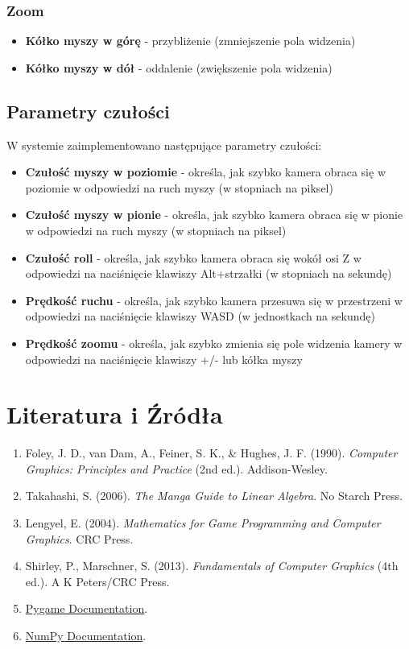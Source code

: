 \documentclass[a4paper,12pt]{article}
\begin{document}
\subsubsection{Zoom}
\begin{itemize}
    \item \textbf{Kółko myszy w górę} - przybliżenie (zmniejszenie pola widzenia)
    \item \textbf{Kółko myszy w dół} - oddalenie (zwiększenie pola widzenia)
\end{itemize}

\subsection{Parametry czułości}

W systemie zaimplementowano następujące parametry czułości:

\begin{itemize}
    \item \textbf{Czułość myszy w poziomie} - określa, jak szybko kamera obraca się w poziomie w odpowiedzi na ruch myszy (w stopniach na piksel)
    \item \textbf{Czułość myszy w pionie} - określa, jak szybko kamera obraca się w pionie w odpowiedzi na ruch myszy (w stopniach na piksel)
    \item \textbf{Czułość roll} - określa, jak szybko kamera obraca się wokół osi Z w odpowiedzi na naciśnięcie klawiszy Alt+strzałki (w stopniach na sekundę)
    \item \textbf{Prędkość ruchu} - określa, jak szybko kamera przesuwa się w przestrzeni w odpowiedzi na naciśnięcie klawiszy WASD (w jednostkach na sekundę)
    \item \textbf{Prędkość zoomu} - określa, jak szybko zmienia się pole widzenia kamery w odpowiedzi na naciśnięcie klawiszy +/- lub kółka myszy
\end{itemize}

\section{Literatura i Źródła}
\begin{enumerate}
    \item Foley, J. D., van Dam, A., Feiner, S. K., \& Hughes, J. F. (1990). \textit{Computer Graphics: Principles and Practice} (2nd ed.). Addison-Wesley.
    \item Takahashi, S. (2006). \textit{The Manga Guide to Linear Algebra}. No Starch Press.
    \item Lengyel, E. (2004). \textit{Mathematics for Game Programming and Computer Graphics}. CRC Press.
    \item Shirley, P., Marschner, S. (2013). \textit{Fundamentals of Computer Graphics} (4th ed.). A K Peters/CRC Press.
    \item \href{https://www.pygame.org/docs/}{Pygame Documentation}.
    \item \href{https://numpy.org/doc/}{NumPy Documentation}.
\end{enumerate}
\end{document}
